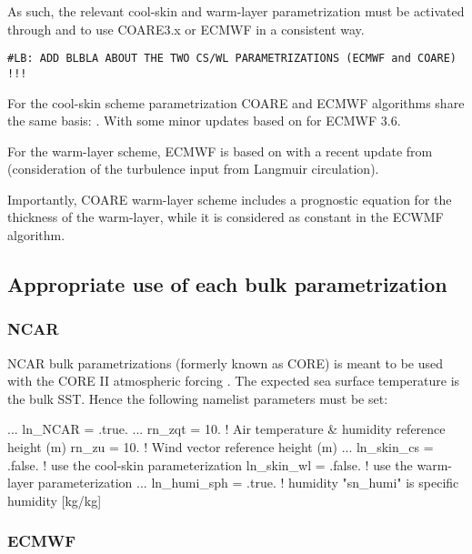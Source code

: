\documentclass[../main/NEMO_manual]{subfiles}
\begin{document}
As such, the relevant cool-skin and warm-layer parametrization must be
activated through 
and  to use COARE3.x or ECMWF in a consistent
way.

\texttt{\#LB: ADD BLBLA ABOUT THE TWO CS/WL PARAMETRIZATIONS (ECMWF and COARE) !!!}

For the cool-skin scheme parametrization COARE and ECMWF algorithms share the same
basis: \citet{fairall.bradley.ea_JGRO96}. With some minor updates based
on \citet{zeng.beljaars_GRL05} for ECMWF \iffalse, and \citet{fairall.ea_19?} for COARE \fi
3.6.

For the warm-layer scheme, ECMWF is based on \citet{zeng.beljaars_GRL05} with a
recent update from \citet{takaya.bidlot.ea_JGR10} (consideration of the
turbulence input from Langmuir circulation).

Importantly, COARE warm-layer scheme \iffalse \citep{fairall.ea_19?} \fi includes a prognostic
equation for the thickness of the warm-layer, while it is considered as constant
in the ECWMF algorithm.

\subsection{Appropriate use of each bulk parametrization}

\subsubsection{NCAR}

NCAR bulk parametrizations (formerly known as CORE) is meant to be used with the
CORE II atmospheric forcing \citep{large.yeager_CD09}. The expected sea surface
temperature is the bulk SST. Hence the following namelist parameters must be
set:

\begin{forlines}
  ...
  ln_NCAR    = .true.
  ...
  rn_zqt     = 10.     ! Air temperature & humidity reference height (m)
  rn_zu      = 10.     ! Wind vector reference height (m)
  ...
  ln_skin_cs = .false. ! use the cool-skin parameterization
  ln_skin_wl = .false. ! use the warm-layer parameterization
  ...
  ln_humi_sph = .true. ! humidity "sn_humi" is specific humidity  [kg/kg]
\end{forlines}

\subsubsection{ECMWF}
\end{document}
